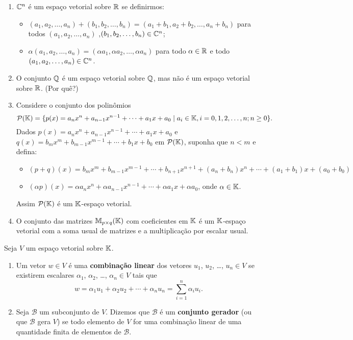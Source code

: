 \begin{exemplo}
\begin{enumerate}[label={\arabic*})]
\begin{itemize}
		\end{itemize}
		\item $\mathbb{C}^n$ \'e um espa\c{c}o vetorial sobre $\mathbb{R}$ se definirmos:
		\begin{itemize}
			\item $(a_1, a_2, \dots, a_n) + (b_1, b_2, \dots,b_n) = (a_1 + b_1, a_2 + b_2,\dots, a_n + b_n)$ para todos $(a_1, a_2, \dots,a_n)$ ,$(b_1, b_2, \dots,b_n) \in \mathbb{C}^n$;
			\item $\alpha (a_1, a_2, \dots,a_n) = (\alpha a_1, \alpha a_2, \dots, \alpha a_n)$ para todo $\alpha \in \mathbb{R}$ e todo $(a_1, a_2, \dots, a_n) \in \mathbb{C}^n$.
		\end{itemize}
		\item O conjunto $\mathbb{Q}$ \'e um espa\c{c}o vetorial sobre $\mathbb{Q}$, mas n\~ao \'e um espa\c{c}o vetorial sobre $\mathbb{R}$. (Por qu\^e?)
		\item Considere o conjunto dos polin\^omios
		\[
			\mathcal{P}(\mathbb{K}) = \{ p(x) = a_nx^n + a_{n - 1}x^{n - 1} + \cdots + a_1x + a_0 \mid a_i \in \mathbb{K}, i = 0, 1, 2, \dots, n; n \ge 0 \}.
		\]
		Dados $p(x) = a_nx^n + a_{n - 1}x^{n - 1} + \cdots + a_1x + a_0$ e $q(x) = b_mx^m + b_{m - 1}x^{m - 1} + \cdots + b_1x + b_0$ em $\mathcal{P}(\mathbb{K})$, suponha que $n < m$ e defina:
		\begin{itemize}
			\item $(p + q)(x) = b_mx^m + b_{m - 1}x^{m - 1} + \cdots + b_{n + 1}x^{n + 1} + (a_n + b_n)x^n + \cdots + (a_1 + b_1)x + (a_0 + b_0)$
			\item $(\alpha p)(x) = \alpha a_nx^n + \alpha a_{n - 1}x^{n - 1} + \cdots + \alpha a_1x + \alpha a_0$, onde $\alpha \in \mathbb{K}$.
		\end{itemize}
		Assim $\mathcal{P}(\mathbb{K})$ \'e um $\mathbb{K}$-espa\c{c}o vetorial.
		\item O conjunto das matrizes $\mathbb{M}_{p \times q}(\mathbb{K})$ com coeficientes em $\mathbb{K}$ \'e um $\mathbb{K}$-espa\c{c}o vetorial com a soma usual de matrizes e a multiplica\c{c}\~ao por escalar usual.
	\end{enumerate}
\end{exemplo}

\begin{definicao}
	Seja $V$ um espa\c{c}o vetorial sobre $\mathbb{K}$.
	\begin{enumerate}[label={\roman*})]
		\item Um vetor $w \in V$ \'e uma \textbf{combina\c{c}\~ao linear} dos vetores $u_1$, $u_2$, \dots, $u_n \in V$ se existirem escalares $\alpha_1$, $\alpha_2$, \dots, $\alpha_n \in V$ tais que
		\[
			w = \alpha_1 u_1 + \alpha_2u_2 + \cdots + \alpha_nu_n = \sum_{i = 1}^n \alpha_iu_i.
		\]
		\item Seja $\mathcal{B}$ um subconjunto de $V$. Dizemos que $\mathcal{B}$ \'e um \textbf{conjunto gerador} (ou que $\mathcal{B}$ gera $V$) se todo elemento de $V$ for uma combina\c{c}\~ao linear de uma quantidade finita de elementos de $\mathcal{B}$.
	\end{enumerate}
\end{definicao}

